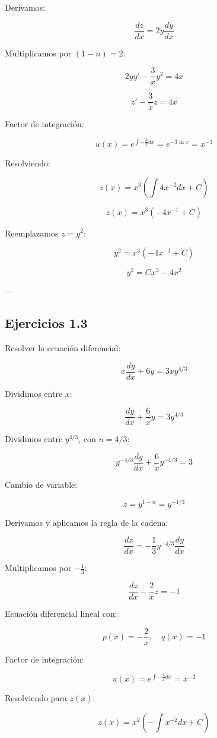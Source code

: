 Derivamos:

\[
\frac{dz}{dx} = 2y \frac{dy}{dx}
\]

Multiplicamos por \( (1-n) = 2 \):

\[
2yy' - \frac{3}{x} y^2 = 4x
\]

\[
z' - \frac{3}{x} z = 4x
\]

Factor de integración:

\[
u(x) = e^{\int -\frac{3}{x} dx} = e^{-3\ln x} = x^{-3}
\]

Resolviendo:

\[
z(x) = x^3 \left(\int 4x^{-2} dx + C\right)
\]

\[
z(x) = x^3 \left(-4x^{-1} + C\right)
\]

Reemplazamos \( z = y^2 \):

\[
y^2 = x^3 \left(-4x^{-1} + C\right)
\]

\[
y^2 = Cx^3 - 4x^2
\]

---

\subsection* {Ejercicios 1.3}

Resolver la ecuación diferencial:

\[
x \frac{dy}{dx} + 6y = 3x y^{4/3}
\]

Dividimos entre \( x \):

\[
\frac{dy}{dx} + \frac{6}{x} y = 3y^{4/3}
\]

Dividimos entre \( y^{4/3} \), con \( n = 4/3 \):

\[
y^{-4/3} \frac{dy}{dx} + \frac{6}{x} y^{-1/3} = 3
\]

Cambio de variable:

\[
z = y^{1-n} = y^{-1/3}
\]

Derivamos y aplicamos la regla de la cadena:

\[
\frac{dz}{dx} = -\frac{1}{3} y^{-4/3} \frac{dy}{dx}
\]

Multiplicamos por \( -\frac{1}{3} \):

\[
\frac{dz}{dx} - \frac{2}{x} z = -1
\]

Ecuación diferencial lineal con:

\[
p(x) = -\frac{2}{x}, \quad q(x) = -1
\]

Factor de integración:

\[
u(x) = e^{\int -\frac{2}{x} dx} = x^{-2}
\]

Resolviendo para \( z(x) \):

\[
z(x) = x^2 \left(-\int x^{-2} dx + C\right)
\]

